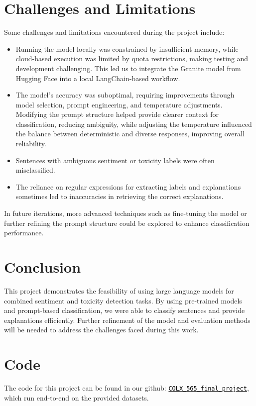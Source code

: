 \documentclass[11pt]{article}
\begin{document}
\section{Challenges and Limitations}
Some challenges and limitations encountered during the project include:
\begin{itemize}
\item Running the model locally was constrained by insufficient memory, while cloud-based execution was limited by quota restrictions, making testing and development challenging. This led us to integrate the Granite model from Hugging Face into a local LangChain-based workflow.
\item The model’s accuracy was suboptimal, requiring improvements through model selection, prompt engineering, and temperature adjustments. Modifying the prompt structure helped provide clearer context for classification, reducing ambiguity, while adjusting the temperature influenced the balance between deterministic and diverse responses, improving overall reliability.
\item Sentences with ambiguous sentiment or toxicity labels were often misclassified.
\item The reliance on regular expressions for extracting labels and explanations sometimes led to inaccuracies in retrieving the correct explanations.
\end{itemize}

In future iterations, more advanced techniques such as fine-tuning the model or further refining the prompt structure could be explored to enhance classification performance.

\section{Conclusion}
This project demonstrates the feasibility of using large language models for combined sentiment and toxicity detection tasks. By using pre-trained models and prompt-based classification, we were able to classify sentences and provide explanations efficiently. Further refinement of the model and evaluation methods will be needed to address the challenges faced during this work.

\section{Code}
The code for this project can be found in our github: \texttt{\href{https://github.ubc.ca/MDS-CL-2024-25/COLX_565_final_project}{\textcolor{black}{\faGithub \space COLX\_565\_final\_project}}}, which run end-to-end on the provided datasets.
\end{document}
